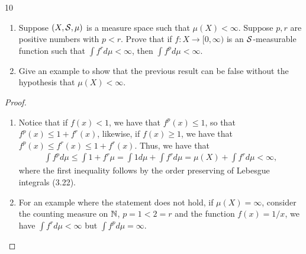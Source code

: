 \begin{exercise}{10}
\begin{enumerate}
    \item Suppose $(X, \mathcal{S}, \mu)$ is a measure space such that $\mu(X) < \infty$.
    Suppose $p, r$ are positive numbers with $p < r$.
    Prove that if $f: X \to [0, \infty)$ is an $\mathcal{S}$-measurable function such that $\int f^r d\mu < \infty$, then $\int f^p d\mu < \infty$.
    \item Give an example to show that the previous result can be false without the hypothesis that $\mu(X) < \infty$.
\end{enumerate}
\end{exercise}
\begin{proof}
\begin{enumerate}
    \item Notice that if $f(x) < 1$, we have that $f^p(x) \leq 1$, so that $f^p(x) \leq 1 + f^r(x)$, likewise, if $f(x) \geq 1$, we have that $f^p(x) \leq f^r(x) \leq 1 + f^r(x)$.
    Thus, we have that 
    \begin{align*}
        \int f^p d\mu 
        \leq \int 1 + f^r \mu 
        = \int 1 d\mu + \int f^r d\mu
        = \mu(X) + \int f^r d\mu 
        < \infty,
    \end{align*}
    where the first inequality follows by the order preserving of Lebesgue integrals (3.22).
    \item For an example where the statement does not hold, if $\mu(X) = \infty$, consider the counting measure on $\mathbb{N}$, $p = 1 < 2 = r$ and the function $f(x) = 1/x$, we have $\int f^r d\mu < \infty$ but $\int f^p d\mu = \infty$.
\end{enumerate}
\end{proof} 
